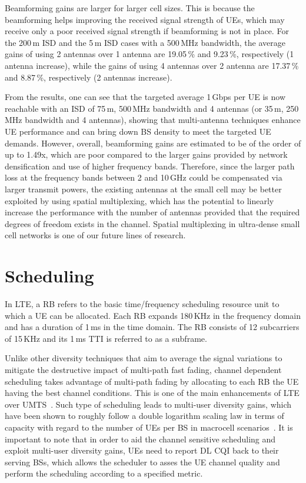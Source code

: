 \documentclass{IEEEtran}
\begin{document}
Beamforming gains are larger for larger cell sizes.
This is because the beamforming helps improving the received signal strength of \acp{UE},
which may receive only a poor received signal strength if beamforming is not in place.
For the 200\,m \ac{ISD} and the 5\,m \ac{ISD} cases with a 500\,MHz bandwidth,
the average gains of using 2 antennas over 1 antenna are 19.05\,\% and 9.23\,\%, respectively (1 antenna increase),
while the gains of using 4 antennas over 2 antenna are 17.37\,\% and 8.87\,\%, respectively (2 antennas increase).

From the results,
one can see that the targeted average 1\,Gbps per \ac{UE} is now reachable with an \ac{ISD} of 75\,m, 500\,MHz bandwidth and 4 antennas (or 35\,m, 250\,MHz bandwidth and 4 antennas),
showing that multi-antenna techniques enhance \ac{UE} performance and can bring down \ac{BS} density
to meet the targeted \ac{UE} demands.
However, overall, beamforming gains are estimated to be of the order of up to 1.49x,
which are poor compared to the larger gains provided by network densification and use of higher frequency bands.
Therefore, since the larger path loss at the frequency bands between 2 and 10\,GHz could be compensated via larger transmit powers,
the existing antennas at the small cell may be better exploited by using spatial multiplexing,
which has the potential to linearly increase the performance with the number of antennas
provided that the required degrees of freedom exists in the channel.
Spatial multiplexing in ultra-dense small cell networks is one of our future lines of research.

\section{Scheduling}
\label{Sec:scheduling}

In \ac{LTE}, a \ac{RB} refers to the basic time/frequency scheduling resource unit to which a \ac{UE} can be allocated.
Each \ac{RB} expands 180\,KHz in the frequency domain and has a duration of  1\,ms in the time domain.
The \ac{RB} consists of 12 subcarriers of 15\,KHz and its 1\,ms \ac{TTI} is referred to as a subframe.

Unlike other diversity techniques that aim to average the signal variations to mitigate the destructive impact of multi-path fast fading,
channel dependent scheduling takes advantage of multi-path fading
by allocating to each \ac{RB} the \ac{UE} having the best channel conditions.
This is one of the main enhancements of \ac{LTE} over \ac{UMTS}~\cite{Sesia2009}.
Such type of scheduling leads to multi-user diversity gains,
which have been shown to roughly follow a double logarithm scaling law in terms of capacity with regard to the number of \acp{UE} per \ac{BS}
in macrocell scenarios~\cite{4063519}.
It is important to note that in order to aid the channel sensitive scheduling and exploit multi-user diversity gains,
\acp{UE} need to report \ac{DL} \ac{CQI} back to their serving \acp{BS},
which allows the scheduler to asses the \ac{UE} channel quality and perform the scheduling according to a specified metric.
\end{document}
